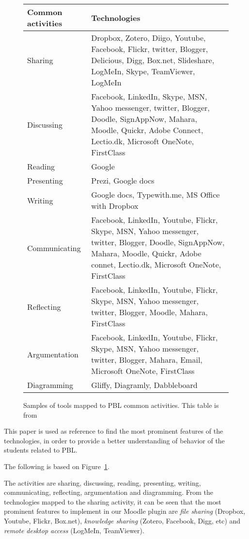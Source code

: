 \begin{figure}		
\begin{tabular}{|p{3cm}|p{}|}
\hline
Common activities & Technologies \\ \hline
Sharing & Dropbox, Zotero, Diigo, Youtube, Facebook, Flickr, twitter, Blogger, Delicious, Digg, Box.net, Slideshare, LogMeIn, Skype, 
TeamViewer, LogMeIn  \\ \hline
Discussing & Facebook, LinkedIn, Skype, MSN, Yahoo messenger, twitter, Blogger, Doodle, SignAppNow, Mahara, Moodle, Quickr, Adobe Connect, Lectio.dk, Microsoft OneNote, FirstClass \\ \hline
Reading & Google \\ \hline
Presenting & Prezi, Google docs \\ \hline
Writing & Google docs, Typewith.me, MS Office with Dropbox \\ \hline
Communicating & Facebook, LinkedIn, Youtube, Flickr, Skype, MSN, Yahoo messenger, twitter, Blogger, Doodle, SignAppNow, Mahara, Moodle, Quickr, Adobe connet, Lectio.dk, Microsoft OneNote, FirstClass \\ \hline
Reflecting & Facebook, LinkedIn, Youtube, Flickr, Skype, MSN, Yahoo messenger, twitter, Blogger, Moodle, Mahara, FirstClass \\ \hline
Argumentation & Facebook, LinkedIn, Youtube, Flickr, Skype, MSN, Yahoo messenger, twitter, Blogger, Mahara, Email, Microsoft OneNote, FirstClass \\ \hline
Diagramming & Gliffy, Diagramly, Dabbleboard \\ \hline

\end{tabular}
\caption{Samples of tools mapped to PBL common activities. This table is from~\cite{khalidRongbutsriBuus}   }
\label{tab:figure3}
\end{figure}


This paper is used as reference to find the most prominent features of the technologies, in order to provide a better understanding of behavior of the students related to PBL.

The following is based on Figure~\ref{tab:figure3}.

The activities are sharing, discussing, reading, presenting, writing, communicating, reflecting, argumentation and diagramming.
From the technologies mapped to the sharing activity, it can be seen that the most prominent features to implement in our Moodle plugin are \textit{file sharing} (Dropbox, Youtube, Flickr, Box.net), \textit{knowledge sharing} (Zotero, Facebook, Digg, etc) and \textit{remote desktop access} (LogMeIn, TeamViewer).

